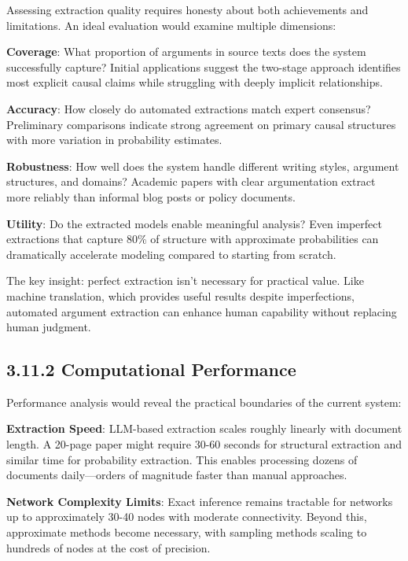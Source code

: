 \documentclass[
  11pt,
  letterpaper,
]{book}
\begin{document}
Assessing extraction quality requires honesty about both achievements
and limitations. An ideal evaluation would examine multiple dimensions:

\textbf{Coverage}: What proportion of arguments in source texts does the
system successfully capture? Initial applications suggest the two-stage
approach identifies most explicit causal claims while struggling with
deeply implicit relationships.

\textbf{Accuracy}: How closely do automated extractions match expert
consensus? Preliminary comparisons indicate strong agreement on primary
causal structures with more variation in probability estimates.

\textbf{Robustness}: How well does the system handle different writing
styles, argument structures, and domains? Academic papers with clear
argumentation extract more reliably than informal blog posts or policy
documents.

\textbf{Utility}: Do the extracted models enable meaningful analysis?
Even imperfect extractions that capture 80\% of structure with
approximate probabilities can dramatically accelerate modeling compared
to starting from scratch.

The key insight: perfect extraction isn't necessary for practical value.
Like machine translation, which provides useful results despite
imperfections, automated argument extraction can enhance human
capability without replacing human judgment.

\subsection{3.11.2 Computational
Performance}\label{sec-computational-performance}

Performance analysis would reveal the practical boundaries of the
current system:

\textbf{Extraction Speed}: LLM-based extraction scales roughly linearly
with document length. A 20-page paper might require 30-60 seconds for
structural extraction and similar time for probability extraction. This
enables processing dozens of documents daily---orders of magnitude
faster than manual approaches.

\textbf{Network Complexity Limits}: Exact inference remains tractable
for networks up to approximately 30-40 nodes with moderate connectivity.
Beyond this, approximate methods become necessary, with sampling methods
scaling to hundreds of nodes at the cost of precision.
\end{document}
